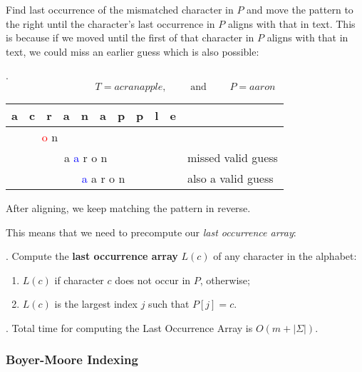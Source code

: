 \documentclass{article}
\begin{document}
\begin{solution}
    Find last occurrence of the mismatched character in $P$ and move the pattern to the right until the character's last occurrence in $P$ aligns with that in text. This is because if we moved until the first of that character in $P$ aligns with that in text, we could miss an earlier guess which is also possible: \begin{examplee}[].
        \[ T = acranapple, \qquad \text{ and } \qquad P = aaron \]
    \begin{center}
        \begin{tabular}{|c|c|c|c|c|c|c|c|c|c|l|}
            \hline
            a & c & r & a & n & a & p & p & l & e & \\ \hline
            \multicolumn{5}{|c|}{\qquad \qquad \quad \textcolor{red}{o} \;\; n} & & & & & & \\ \hline
            & & \multicolumn{5}{|c|}{a \quad \textcolor{blue}{a} \;\; r \;\; o \quad n} & & & & missed valid guess \\ \hline
            & & & \multicolumn{5}{|c|}{\textcolor{blue}{a} \quad a \;\; r \;\; o \quad n} & & & also a valid guess \\ \hline
        \end{tabular}
    \end{center}
    \end{examplee}
    After aligning, we keep matching the pattern in reverse.
\end{solution}

This means that we need to precompute our \textit{last occurrence array}: 

\begin{deff}.
    Compute the \textbf{last occurrence array} $L(c)$ of any character in the alphabet: \begin{enumerate}
        \item $L(c)$ if character $c$ does not occur in $P$, otherwise; 
        \item $L(c)$ is the largest index $j$ such that $P[j] = c$. 
    \end{enumerate}
\end{deff}

\begin{result}[].
    Total time for computing the Last Occurrence Array is $O(m + |\Sigma|)$.
\end{result}

\subsubsection{Boyer-Moore Indexing} 
\end{document}
